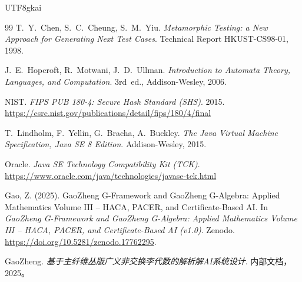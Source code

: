 \documentclass[12pt]{article}
\begin{document}
\begin{CJK*}{UTF8}{gkai}
\begin{thebibliography}{99}
T.~Y.~Chen, S.~C.~Cheung, S.~M.~Yiu.
\emph{Metamorphic Testing: a New Approach for Generating Next Test Cases}.
Technical Report HKUST-CS98-01, 1998.

J.~E.~Hopcroft, R.~Motwani, J.~D.~Ullman.
\emph{Introduction to Automata Theory, Languages, and Computation}.
3rd~ed., Addison-Wesley, 2006.

NIST.
\emph{FIPS PUB 180-4: Secure Hash Standard (SHS)}.
2015.
\url{https://csrc.nist.gov/publications/detail/fips/180/4/final}

T.~Lindholm, F.~Yellin, G.~Bracha, A.~Buckley.
\emph{The Java Virtual Machine Specification, Java SE 8 Edition}.
Addison-Wesley, 2015.

Oracle.
\emph{Java SE Technology Compatibility Kit (TCK)}.
\url{https://www.oracle.com/java/technologies/javase-tck.html}

Gao, Z. (2025).
\newblock GaoZheng G-Framework and GaoZheng G-Algebra: Applied Mathematics Volume III – HACA, PACER, and
  Certificate-Based AI.
\newblock In \emph{GaoZheng G-Framework and GaoZheng G-Algebra: Applied Mathematics Volume III – HACA, PACER, and
  Certificate-Based AI (v1.0)}.
\newblock Zenodo.
\newblock \url{https://doi.org/10.5281/zenodo.17762295}.


GaoZheng.
\emph{基于主纤维丛版广义非交换李代数的解析解AI系统设计}.
内部文档，2025。

\end{thebibliography}

\end{CJK*}
\end{document}
